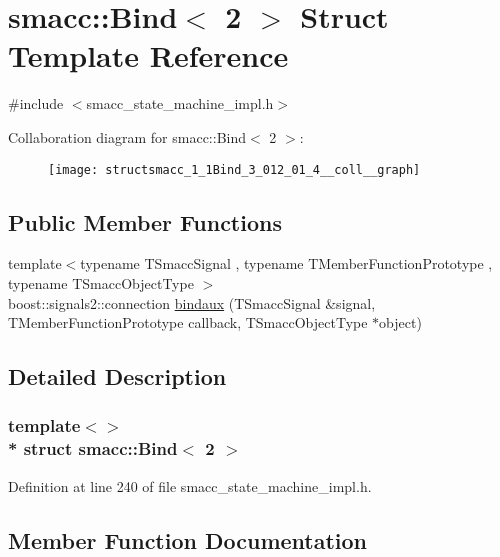 \hypertarget{structsmacc_1_1Bind_3_012_01_4}{}\section{smacc\+:\+:Bind$<$ 2 $>$ Struct Template Reference}
\label{structsmacc_1_1Bind_3_012_01_4}


{\ttfamily \#include $<$smacc\+\_\+state\+\_\+machine\+\_\+impl.\+h$>$}



Collaboration diagram for smacc\+:\+:Bind$<$ 2 $>$\+:
\nopagebreak
\begin{figure}[H]
\begin{center}
\leavevmode
\texttt{[image: structsmacc\_1\_1Bind\_3\_012\_01\_4\_\_coll\_\_graph]}
\end{center}
\end{figure}
\subsection*{Public Member Functions}
\begin{DoxyCompactItemize}
\item 
{\footnotesize template$<$typename T\+Smacc\+Signal , typename T\+Member\+Function\+Prototype , typename T\+Smacc\+Object\+Type $>$ }\\boost\+::signals2\+::connection \hyperlink{structsmacc_1_1Bind_3_012_01_4_ad974781e83d154953d6a4ae0f3632a8f}{bindaux} (T\+Smacc\+Signal \&signal, T\+Member\+Function\+Prototype callback, T\+Smacc\+Object\+Type $\ast$object)
\end{DoxyCompactItemize}


\subsection{Detailed Description}
\subsubsection*{template$<$$>$\\*
struct smacc\+::\+Bind$<$ 2 $>$}



Definition at line 240 of file smacc\+\_\+state\+\_\+machine\+\_\+impl.\+h.



\subsection{Member Function Documentation}
